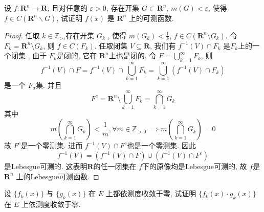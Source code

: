 \documentclass[../main.tex]{subfiles}
\begin{document}
\begin{exercise}{}{} 
设 $f: \mathbf{R}^n \to \mathbf{R}$, 且对任意的 $\varepsilon > 0$, 存在开集 $G \subset \mathbf{R}^n$, $m(G) < \varepsilon$, 使得 $f \in C(\mathbf{R}^n \backslash G)$, 试证明 $f(x)$ 是 $\mathbf{R}^n$ 上的可测函数.
\end{exercise}
\begin{proof}
    任取 \(  k\in \mathbb{Z} _{> }  \),存在开集 \(  G_{k}  \) , 使得 \(  m\left( G_{k} \right)< \frac{1 }{k }    \), \(  f\in C\left( \mathbf{R}^{n}\setminus G_{k} \right)   \).  令 \(  F_{k}= \mathbf{R}^{n}\setminus G_{k}  \), 则 \(  f \in C\left( F_{k} \right)   \). 任取闭集 \(  V\subseteq \mathbf{R}  \), 我们有 \(  f^{-1} \left( V \right)\cap F_{k}\) 是\(  F_{k}  \)上的一个闭集 ,  由于 \(  F_{k}  \)是闭的, 它在 \(  \mathbf{R}^{n}  \)上也是闭的.  令 \(  F= \bigcup _{k= 1}^{\infty}F_{k}  \), 则 \[
   f^{-1} \left( V \right)\cap F=  f^{-1} \left( V \right)\cap \bigcup _{k= 1}^{\infty}F_{k}=   \bigcup _{k= 1}^{\infty}\left( f^{-1} \left( V \right)\cap F_{k}  \right) 
    \]    是一个 \(  F_{ \sigma }  \)集. 并且 \[
   F^{c}=  \mathbf{R}^{n}\setminus \bigcup _{k= 1}^{\infty}F_{k}= \bigcap _{k= 1}^{\infty}G_{k}
    \] 其中 \[
    m\left( \bigcap _{k= 1}^{\infty}G_{k} \right)< \frac{1 }{m },\forall m \in \mathbb{Z} _{> 0}\implies m\left( \bigcap _{k= 1}^{\infty}G_{k} \right)= 0   
    \]故 \(F^{c} \)是一个零测集. 进而 \(  f^{-1} \left( V \right)\cap F^{c}   \)也是一个零测集. 因此 \[
    f^{-1} \left( V \right)= \left( f^{-1} \left( V \right)\cap F  \right)\cup \left( f^{-1} \left( V \right)\cap F^{c}  \right)   
    \] 是Lebesgue可测的.  这表明\(  \mathbf{R}  \)的任一闭集在 \(  f  \)下的原像均是Lebesgue可测的, 故 \(  f  \)是 \(  \mathbf{R}^{n}  \)    上的Lebesgue可测函数.
\end{proof}

\begin{exercise}{}{} 
设 $\{f_k(x)\}$ 与 $\{g_k(x)\}$ 在 $E$ 上都依测度收敛于零, 试证明 $\{f_k(x) \cdot g_k(x)\}$ 在 $E$ 上依测度收敛于零.
\end{exercise}
\end{document}

